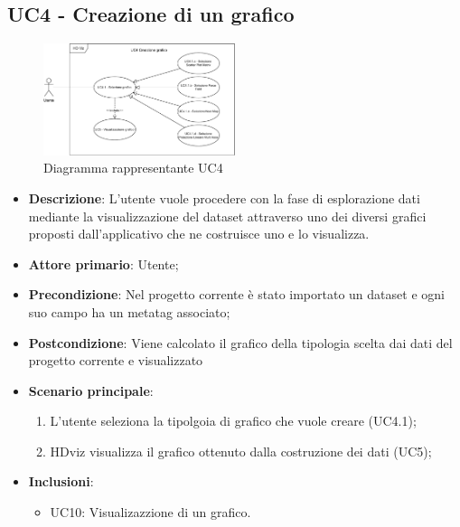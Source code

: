 \newpage
\subsection{UC4 - Creazione di un grafico}
\label{sub:uc2}

\begin{figure}[h]
    \centering
    \includegraphics[width=0.5\textwidth]{componenti/casi-duso/diagrammi/UC4.pdf}
    \caption{Diagramma rappresentante UC4}
    \label{fig:UC2}
\end{figure}


\begin{itemize}
    \item \textbf{Descrizione}: L’utente vuole procedere con la fase di esplorazione
                                dati mediante la visualizzazione del dataset
                                attraverso uno dei diversi grafici proposti dall’applicativo
                                che ne costruisce uno e lo visualizza.
	
    \item \textbf{Attore primario}: Utente;
    
    \item \textbf{Precondizione}:   Nel progetto corrente è stato importato un dataset e ogni 
                                    suo campo ha un metatag associato;

    \item \textbf{Postcondizione}:  Viene calcolato il grafico della tipologia scelta dai dati del progetto 
                                    corrente e visualizzato
	\item \textbf{Scenario principale}:
		\begin{enumerate}
			\item L'utente seleziona la tipolgoia di grafico che vuole creare (UC4.1);
			\item HDviz visualizza il grafico ottenuto dalla costruzione dei dati (UC5);
        \end{enumerate}

    \item \textbf{Inclusioni}: 
            \begin{itemize}
                \item UC10: Visualizazzione di un grafico.
            \end{itemize}
    \end{itemize}


